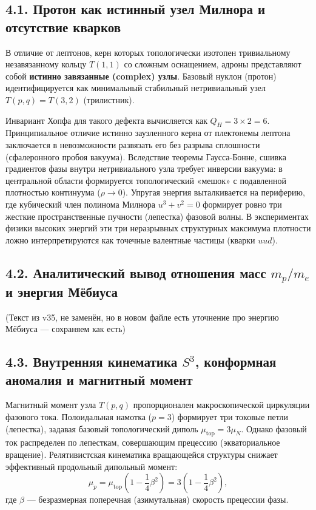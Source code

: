 \documentclass[11pt,a4paper]{article}
\begin{document}
	\subsection{4.1. Протон как истинный узел Милнора и отсутствие кварков}
	В отличие от лептонов, керн которых топологически изотопен тривиальному незавязанному кольцу $T(1,1)$ со сложным оснащением, адроны представляют собой \textbf{истинно завязанные (complex) узлы}. 
	Базовый нуклон (протон) идентифицируется как минимальный стабильный нетривиальный узел $T(p,q) = T(3,2)$ (трилистник).
	
	Инвариант Хопфа для такого дефекта вычисляется как $Q_H = 3 \times 2 = 6$. 
	Принципиальное отличие истинно заузленного керна от плектонемы лептона заключается в невозможности развязать его без разрыва сплошности (сфалеронного пробоя вакуума). Вследствие теоремы Гаусса-Бонне, сшивка градиентов фазы внутри нетривиального узла требует инверсии вакуума: в центральной области формируется топологический «мешок» с подавленной плотностью континуума ($\rho \to 0$).
	Упругая энергия выталкивается на периферию, где кубический член полинома Милнора $u^3+v^2=0$ формирует ровно три жесткие пространственные пучности (лепестка) фазовой волны. В экспериментах физики высоких энергий эти три неразрывных структурных максимума плотности ложно интерпретируются как точечные валентные частицы (кварки $uud$).
	
	\subsection{4.2. Аналитический вывод отношения масс $m_p/m_e$ и энергия Мёбиуса}
	(Текст из v35, не заменён, но в новом файле есть уточнение про энергию Мёбиуса — сохраняем как есть)
	
	\subsection{4.3. Внутренняя кинематика $S^3$, конформная аномалия и магнитный момент}
	Магнитный момент узла $T(p,q)$ пропорционален макроскопической циркуляции фазового тока. Полоидальная намотка ($p=3$) формирует три токовые петли (лепестка), задавая базовый топологический диполь $\mu_{\text{top}} = 3 \mu_N$. Однако фазовый ток распределен по лепесткам, совершающим прецессию (экваториальное вращение). Релятивистская кинематика вращающейся структуры снижает эффективный продольный дипольный момент:
	\begin{equation}
		\mu_p = \mu_{\text{top}} \left(1 - \frac{1}{4}\beta^2\right) = 3 \left(1 - \frac{1}{4}\beta^2\right),
	\end{equation}
	где $\beta$ — безразмерная поперечная (азимутальная) скорость прецессии фазы.
	
\end{document}
